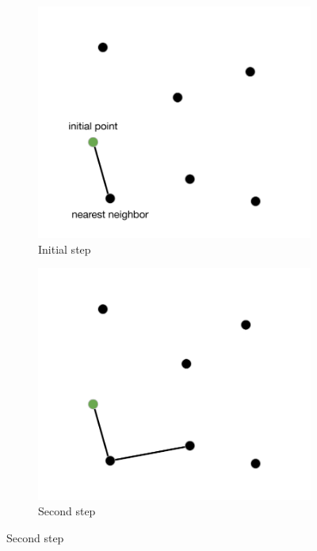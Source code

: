 \begin{figure}[h!]
  \centering
  \begin{subfigure}[b]{0.48\linewidth}
    \includegraphics[width=\linewidth]{media/fase1.pdf}
     \caption{Initial step}
  \end{subfigure}
  \begin{subfigure}[b]{0.48\linewidth}
    \includegraphics[width=\linewidth]{media/fase2.pdf}
    \caption{Second step}
  \end{subfigure}

\end{figure}
